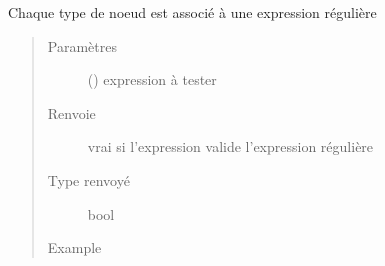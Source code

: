 \documentclass[letterpaper,10pt,french]{sphinxmanual}
\begin{document}
\begin{fulllineitems}
\begin{fulllineitems}
\begin{quote}
\begin{description}
\end{description}\end{quote}

\end{fulllineitems}


\begin{fulllineitems}
\label{\detokenize{parsertokens:parsertokens.Token.test}}
Chaque type de noeud est associé à une expression régulière
\begin{quote}\begin{description}
\item[{Paramètres}] \leavevmode
{} () \textendash{} expression à tester

\item[{Renvoie}] \leavevmode
vrai si l’expression valide l’expression régulière

\item[{Type renvoyé}] \leavevmode
bool

\item[{Example}] \leavevmode
\begin{sphinxVerbatim}[commandchars=\\\{\}]
\end{sphinxVerbatim}

\end{description}\end{quote}

\end{fulllineitems}


\end{fulllineitems}

\end{document}
